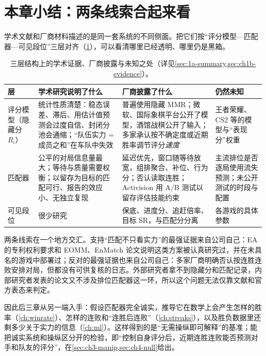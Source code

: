


\section{本章小结：两条线索合起来看}
\label{sec:ch1-summary}

学术文献和厂商材料描述的是同一套系统的不同侧面。把它们按“评分模型—匹配器—可见段位”三层对齐（\cref{tab:ch1-layers}），可以看清哪里已经透明、哪里仍是黑箱。

\begin{table}[htbp]
  \centering\footnotesize
  \caption{三层结构上的学术证据、厂商披露与未知之处（详见\cref{sec:1a-summary,sec:ch1b-evidence}）。}
  \label{tab:ch1-layers}
  \begin{tabularx}{\linewidth}{>{\raggedright\arraybackslash}p{1.6cm}>{\raggedright\arraybackslash}X>{\raggedright\arraybackslash}X>{\raggedright\arraybackslash}p{3.0cm}}
    \toprule
    层 & 学术研究说明了什么 & 厂商披露了什么 & 仍然未知 \\
    \midrule
    评分模型（隐藏分 $R_i$） & 统计性质清楚：稳态误差、滞后、用估计值预测会过度自信、封闭分池会通缩；“队伍实力 = 成员之和”在车队中失效 & 普遍使用隐藏 MMR；微软、国际象棋平台公开了模型，酒馆战棋公开了输入；多家承认按不确定度或近期胜率调节评分\emph{速度} & 王者荣耀、CS2 等的模型与“表现分”权重 \\
    匹配器 & 公平的对局信息量最大；等待与质量需要权衡；以留存为目标的匹配可行、报告的效应小、无独立复现 & 延迟优先，窗口随等待放宽，组排聚合、补位、行为分；否认读取连胜；Activision 用 A/B 测试以留存评估技能约束 & 主流排位是否逐局使用流失预测；未公开测试的时段与配置 \\
    可见段位 & 很少研究 & 保底、进度分、追赶倍率、目标 SR，与匹配分分离 & 各游戏的具体参数 \\
    \bottomrule
  \end{tabularx}
\end{table}

两条线索在一个地方交汇。支持“匹配不只看实力”的最强证据来自公司自己：EA 的专利权利要求和 EOMM、EnMatch 论文说明这类方案被认真研究过，并在未具名的游戏中部署过；反对的最强证据也来自公司自己：多家厂商明确否认按连胜连败安排对局，但都没有可供复核的日志。外部研究者拿不到隐藏分和匹配记录，内部研究者发表的论文又不涉及排位匹配器这一环，所以这个问题无法仅靠文献和官方表态来判定。

因此后三章从另一端入手：假设匹配器完全诚实，推导它在数学上会产生怎样的胜率（\cref{ch:winrate}）、怎样的连败和“连胜后连败”（\cref{ch:streaks}），以及胜负数据里还剩多少关于实力的信息（\cref{ch:ml}）。这样得到的是“无需操纵即可解释”的基准；能把诚实系统和操纵区分开的检验，即“控制自身评分后，近期连胜连败能否预测对手和队友的评分”，在\cref{sec:ch3-manip,sec:ch4-null}给出。
